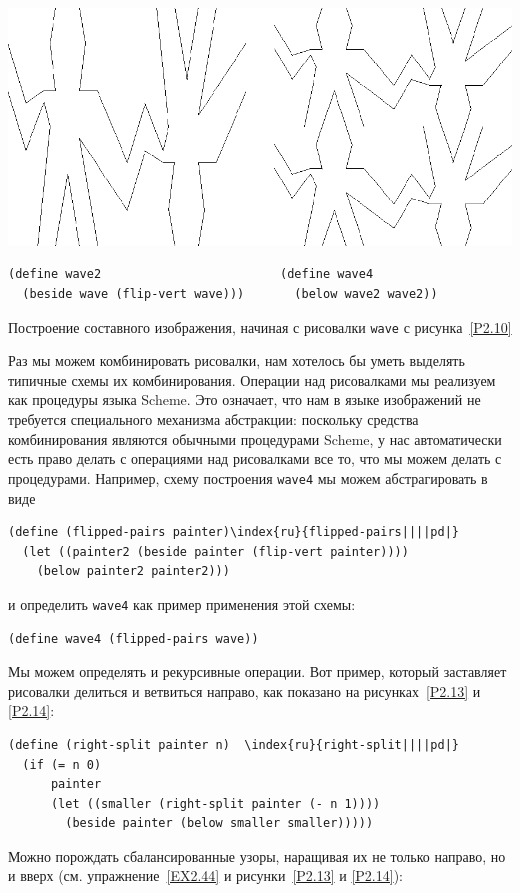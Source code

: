\begin{cntrfig}
\includegraphics{xfig-mod/2-12.eps}
\begin{Verbatim}
(define wave2                         (define wave4
  (beside wave (flip-vert wave)))       (below wave2 wave2))
\end{Verbatim}
\caption{Построение составного изображения,
начиная с рисовалки {\tt wave} с рисунка~\ref{P2.10}}
\label{P2.12}

\end{cntrfig}
Раз мы можем комбинировать рисовалки, нам хотелось бы
уметь выделять типичные схемы их комбинирования.  Операции над
рисовалками мы реализуем как процедуры языка Scheme. Это означает, что 
нам в языке изображений не требуется специального механизма
абстракции:  поскольку средства комбинирования являются обычными
процедурами Scheme, у нас автоматически есть право делать с операциями 
над рисовалками все то, что мы можем делать с процедурами.  Например,
схему построения {\tt wave4} мы можем абстрагировать в виде

\begin{Verbatim}[fontsize=\small]
(define (flipped-pairs painter)\index{ru}{flipped-pairs||||pd|}
  (let ((painter2 (beside painter (flip-vert painter))))
    (below painter2 painter2)))
\end{Verbatim}
и определить {\tt wave4} как пример применения этой схемы:

\begin{Verbatim}[fontsize=\small]
(define wave4 (flipped-pairs wave))
\end{Verbatim}

Мы можем определять и рекурсивные операции.  Вот пример,
который заставляет рисовалки делиться и ветвиться направо, как
показано на рисунках~\ref{P2.13} и \ref{P2.14}:

\begin{Verbatim}[fontsize=\small]
(define (right-split painter n)  \index{ru}{right-split||||pd|}
  (if (= n 0)
      painter
      (let ((smaller (right-split painter (- n 1))))
        (beside painter (below smaller smaller)))))
\end{Verbatim}
Можно порождать сбалансированные узоры, наращивая их не только направо, но
и вверх (см. упражнение~\ref{EX2.44} и рисунки~\ref{P2.13} и \ref{P2.14}):

